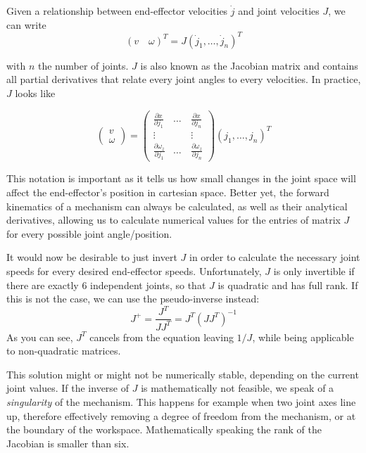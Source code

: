 Given a relationship between end-effector velocities $\dot{j}$ and joint velocities $J$, we can write
\begin{equation}
 (v \quad \omega)^T=J(\dot{j}_1,\ldots,\dot{j}_n)^T
\end{equation}

with $ n$ the number of joints. $J$ is also known as the Jacobian matrix  and contains all partial derivatives that relate every joint angles to every velocities. In practice, $J$ looks like

\begin{equation}
\left(\begin{array}{c}v\\\omega\end{array}\right)=\left(\begin{array}{ccc}\frac{\partial{x}}{\partial{j_1}} & \ldots & \frac{\partial{x}}{\partial{j_n}}\\\vdots & \quad & \vdots\\\frac{\partial{\omega_z}}{\partial{j_1}} & \ldots & \frac{\partial{\omega_z}}{\partial{j_n}}\end{array}\right)(j_1,\ldots,j_n)^T
\end{equation}

This notation is important as it tells us how small changes in the joint space will affect the end-effector's position in cartesian space. Better yet, the forward kinematics of a mechanism can always be calculated, as well as their analytical derivatives, allowing us to calculate numerical values for the entries of matrix $J$ for every possible joint angle/position.

It would now be desirable to just invert $J$ in order to calculate the necessary joint speeds for every desired end-effector speeds. Unfortunately, $ J$ is only invertible if there are exactly 6 independent joints, so that $ J$ is quadratic and has full rank. If this is not the case, we can use the pseudo-inverse instead:
\begin{equation}
J^+=\frac{J^T}{JJ^T}=J^T(JJ^T)^{-1}
\end{equation}
As you can see, $J^T$ cancels from the equation leaving $1/J$, while being applicable to non-quadratic matrices.

This solution might or might not be numerically stable, depending on the current joint values. If the inverse of $J$ is mathematically not feasible, we speak of a \emph{singularity} of the mechanism. This happens for example when two joint axes line up, therefore effectively removing a degree of freedom from the mechanism, or at the boundary of the workspace. Mathematically speaking the rank of the Jacobian is smaller than six.

